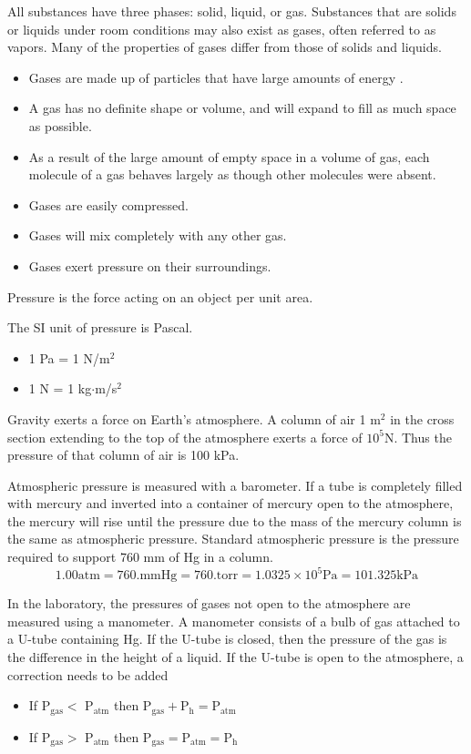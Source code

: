 \documentclass[../chem.tex]{subfiles}
\begin{document}
All substances have three phases: solid, liquid, or gas. Substances that are solids or liquids under room conditions may also exist as gases, often referred to as vapors. Many 
of the properties of gases differ from those of solids and liquids.
\begin{itemize}
    \item Gases are made up of particles that have large amounts of energy .
    \item A gas has no definite shape or volume, and will expand to fill as much space as possible. 
    \item As a result of the large amount of empty space in a volume of gas, each molecule of a gas behaves largely as though other molecules were absent. 
    \item Gases are easily compressed.
    \item Gases will mix completely with any other gas.
    \item Gases exert pressure on their surroundings.
\end{itemize}

Pressure is the force acting on an object per unit area.

The SI unit of pressure is Pascal.
\begin{itemize}
    \item 1 Pa = 1 N/m$^2$
    \item 1 N = 1 kg$\cdot$m/s$^2$
\end{itemize}

Gravity exerts a force on Earth's atmosphere. A column of air 1 m$^2$ in the cross section extending to the top of the atmosphere exerts a force of 
$10^5$N. Thus the pressure of that column of air is 100 kPa.

Atmospheric pressure is measured with a barometer. If a tube is completely filled with mercury and inverted into a container of mercury open to the atmosphere, the mercury 
will rise until the pressure due to the mass of the mercury column is the same as atmospheric pressure. Standard atmospheric pressure is the pressure required 
to support 760 mm of Hg in a column.
\[1.00 \text{atm} = 760. \text{mmHg} = 760. \text{torr} = 1.0325\times 10^5 \text{Pa} = 101.325 \text{kPa}\] 

In the laboratory, the pressures of gases not open to the atmosphere are measured using a manometer. A manometer consists of a bulb of gas attached to a 
U-tube containing Hg. If the U-tube is closed, then the pressure of the gas is the difference in the height of a liquid. If the U-tube is open to the atmosphere, a correction needs to be added
\begin{itemize}
    \item If P$_{\text{gas}} <$ P$_{\text{atm}}$ then P$_{\text{gas}} +$P$_{\text{h}}=$P$_{\text{atm}}$
    \item If P$_{\text{gas}} >$ P$_{\text{atm}}$ then P$_{\text{gas}} =$P$_{\text{atm}}=$P$_{\text{h}}$
\end{itemize}
\end{document}
